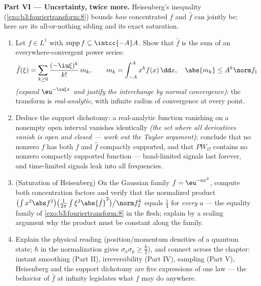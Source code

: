 \begin{problem}[{Weekend problem --- $\partial_tu =
\partial^2_{xx}u$, solved end to end}]
\medskip
\noindent\textbf{Part VI --- Uncertainty, twice more.}
Heisenberg's inequality (\cref{exo:b3:fouriertransform:8})
bounds \emph{how} concentrated $f$ and $\hat f$ can jointly
be; here are its all-or-nothing sibling and its exact
saturation.
\begin{enumerate}[resume]
  \item Let $f \in L^1$ with $\operatorname{supp}f \subseteq
        \intcc{-A}A$. Show that $\hat f$ is the sum of an
        everywhere-convergent power series:
        \[
        \hat f(\xi) = \sum_{k\geq0}\frac{(-\iu\xi)^k}{k!}
        \,m_k, \qquad m_k = \int_{-A}^{A}x^kf(x)\,\dd x,
        \quad \abs{m_k} \leq A^k\norm f_1
        \]
        \emph{(expand $\eu^{-\iu\xi x}$ and justify the
        interchange by normal convergence)}: the transform is
        \emph{real-analytic}, with infinite radius of
        convergence at every point.
  \item Deduce the support dichotomy: a real-analytic
        function vanishing on a nonempty open interval
        vanishes identically \emph{(the set where all
        derivatives vanish is open and closed --- work out
        the Taylor argument)}; conclude that no nonzero $f$
        has both $f$ and $\hat f$ compactly supported, and
        that $PW_\Omega$ contains no nonzero compactly
        supported function --- band-limited signals last
        forever, and time-limited signals leak into all
        frequencies.
  \item (Saturation of Heisenberg) On the Gaussian family $f
        = \eu^{-ax^2}$, compute both concentration factors
        and verify that the normalized product
        $\bigl(\int x^2\abs f^2\bigr)\bigl(\frac1{2\pi}\int
        \xi^2\abs{\hat f}^2\bigr)\big/\norm f_2^4$ equals
        $\frac14$ for \emph{every} $a$ --- the equality
        family of \cref{exo:b3:fouriertransform:8} in the
        flesh; explain by a scaling argument why the product
        must be constant along the family.
  \item Explain the physical reading (position/momentum
        densities of a quantum state; $\hbar$ in the
        normalization gives $\sigma_x\sigma_p \geq
        \frac\hbar2$), and connect across the chapter:
        instant smoothing (Part II), irreversibility (Part
        IV), sampling (Part V), Heisenberg and the support
        dichotomy are five expressions of one law --- the
        behavior of $\hat f$ at infinity legislates what $f$
        may do anywhere.
\end{enumerate}


\end{problem}
